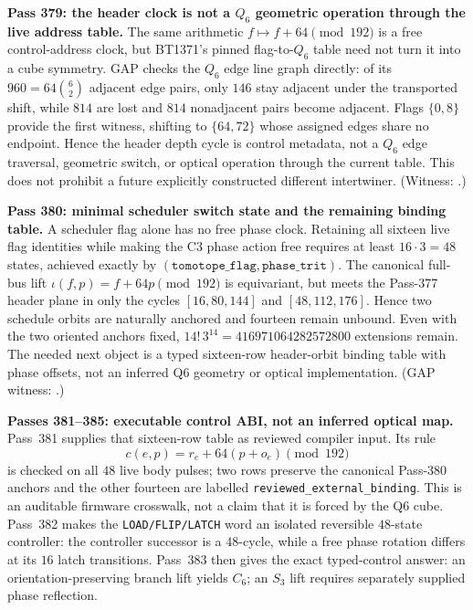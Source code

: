 \documentclass[11pt]{article}
\begin{document}
\smallskip
\noindent\textbf{Pass 379: the header clock is not a \(Q_6\) geometric
operation through the live address table.}  The same arithmetic
$f\mapsto f+64\pmod {192}$ is a free control-address clock, but BT1371's
pinned flag-to-$Q_6$ table need not turn it into a cube symmetry.  GAP checks
the $Q_6$ edge line graph directly: of its $960=64\binom{6}{2}$ adjacent edge
pairs, only $146$ stay adjacent under the transported shift, while $814$ are
lost and $814$ nonadjacent pairs become adjacent.  Flags $\{0,8\}$ provide the
first witness, shifting to $\{64,72\}$ whose assigned edges share no endpoint.
Hence the header depth cycle is control metadata, not a $Q_6$ edge traversal,
geometric switch, or optical operation through the current table.  This does
not prohibit a future explicitly constructed different intertwiner.  (Witness:
.)

\smallskip
\noindent\textbf{Pass 380: minimal scheduler switch state and the remaining
binding table.}  A scheduler flag alone has no free phase clock.  Retaining
all sixteen live flag identities while making the C3 phase action free requires
at least $16\cdot3=48$ states, achieved exactly by
$(\texttt{tomotope\_flag},\texttt{phase\_trit})$.  The canonical full-bus lift
\(\iota(f,p)=f+64p\pmod {192}\) is equivariant, but meets the Pass-377 header
plane in only the cycles $[16,80,144]$ and $[48,112,176]$.  Hence two schedule
orbits are naturally anchored and fourteen remain unbound.  Even with the two
oriented anchors fixed, \(14!\,3^{14}=416971064282572800\) extensions remain.
The needed next object is a typed sixteen-row header-orbit binding table with
phase offsets, not an inferred Q6 geometry or optical implementation.  (GAP
witness: .)

\smallskip
\noindent\textbf{Passes 381--385: executable control ABI, not an inferred
optical map.}  Pass~381 supplies that sixteen-row table as reviewed compiler
input.  Its rule
\[
  c(e,p)=r_e+64(p+o_e)\pmod {192}
\]
is checked on all $48$ live body pulses; two rows preserve the canonical
Pass-380 anchors and the other fourteen are labelled
\texttt{reviewed\_external\_binding}.  This is an auditable firmware
crosswalk, not a claim that it is forced by the Q6 cube.  Pass~382 makes the
\texttt{LOAD/FLIP/LATCH} word an isolated reversible $48$-state controller:
the controller successor is a $48$-cycle, while a free phase rotation differs
at its $16$ latch transitions.  Pass~383 then gives the exact typed-control
answer: an orientation-preserving branch lift yields $C_6$; an $S_3$ lift
requires separately supplied phase reflection.
\end{document}
